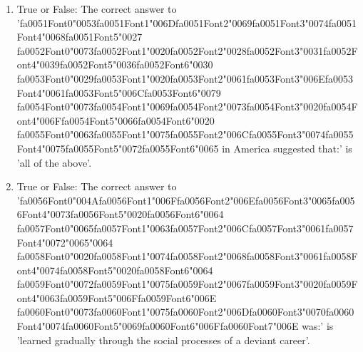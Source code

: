 \documentclass[12pt]{article}
\begin{document}
\begin{enumerate}[label=\arabic*.]
\item True or False: The correct answer to '{\csname fa0051Font0\endcsname\char"0053}{\csname fa0051Font1\endcsname\char"006D}{\csname fa0051Font2\endcsname\char"0069}{\csname fa0051Font3\endcsname\char"0074}{\csname fa0051Font4\endcsname\char"0068}{\csname fa0051Font5\endcsname\char"0027} {\csname fa0052Font0\endcsname\char"0073}{\csname fa0052Font1\endcsname\char"0020}{\csname fa0052Font2\endcsname\char"0028}{\csname fa0052Font3\endcsname\char"0031}{\csname fa0052Font4\endcsname\char"0039}{\csname fa0052Font5\endcsname\char"0036}{\csname fa0052Font6\endcsname\char"0030} {\csname fa0053Font0\endcsname\char"0029}{\csname fa0053Font1\endcsname\char"0020}{\csname fa0053Font2\endcsname\char"0061}{\csname fa0053Font3\endcsname\char"006E}{\csname fa0053Font4\endcsname\char"0061}{\csname fa0053Font5\endcsname\char"006C}{\csname fa0053Font6\endcsname\char"0079} {\csname fa0054Font0\endcsname\char"0073}{\csname fa0054Font1\endcsname\char"0069}{\csname fa0054Font2\endcsname\char"0073}{\csname fa0054Font3\endcsname\char"0020}{\csname fa0054Font4\endcsname\char"006F}{\csname fa0054Font5\endcsname\char"0066}{\csname fa0054Font6\endcsname\char"0020} {\csname fa0055Font0\endcsname\char"0063}{\csname fa0055Font1\endcsname\char"0075}{\csname fa0055Font2\endcsname\char"006C}{\csname fa0055Font3\endcsname\char"0074}{\csname fa0055Font4\endcsname\char"0075}{\csname fa0055Font5\endcsname\char"0072}{\csname fa0055Font6\endcsname\char"0065} in America suggested that:' is 'all of the above'.
\item True or False: The correct answer to '{\csname fa0056Font0\endcsname\char"004A}{\csname fa0056Font1\endcsname\char"006F}{\csname fa0056Font2\endcsname\char"006E}{\csname fa0056Font3\endcsname\char"0065}{\csname fa0056Font4\endcsname\char"0073}{\csname fa0056Font5\endcsname\char"0020}{\csname fa0056Font6\endcsname\char"0064} {\csname fa0057Font0\endcsname\char"0065}{\csname fa0057Font1\endcsname\char"0063}{\csname fa0057Font2\endcsname\char"006C}{\csname fa0057Font3\endcsname\char"0061}{\csname fa0057Font4\endcsname\char"0072}{\char"0065}{\char"0064} {\csname fa0058Font0\endcsname\char"0020}{\csname fa0058Font1\endcsname\char"0074}{\csname fa0058Font2\endcsname\char"0068}{\csname fa0058Font3\endcsname\char"0061}{\csname fa0058Font4\endcsname\char"0074}{\csname fa0058Font5\endcsname\char"0020}{\csname fa0058Font6\endcsname\char"0064} {\csname fa0059Font0\endcsname\char"0072}{\csname fa0059Font1\endcsname\char"0075}{\csname fa0059Font2\endcsname\char"0067}{\csname fa0059Font3\endcsname\char"0020}{\csname fa0059Font4\endcsname\char"0063}{\csname fa0059Font5\endcsname\char"006F}{\csname fa0059Font6\endcsname\char"006E} {\csname fa0060Font0\endcsname\char"0073}{\csname fa0060Font1\endcsname\char"0075}{\csname fa0060Font2\endcsname\char"006D}{\csname fa0060Font3\endcsname\char"0070}{\csname fa0060Font4\endcsname\char"0074}{\csname fa0060Font5\endcsname\char"0069}{\csname fa0060Font6\endcsname\char"006F}{\csname fa0060Font7\endcsname\char"006E} was:' is 'learned gradually through the social processes of a deviant career'.

\end{enumerate}
\end{document}
